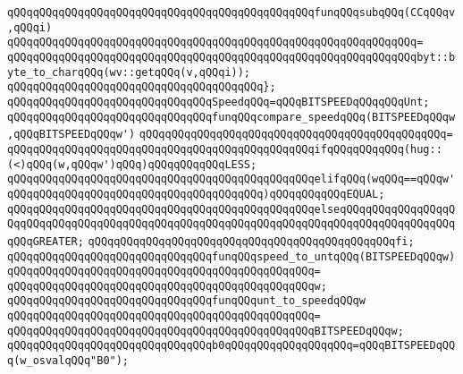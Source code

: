 \newline
\verb|qQQqqQQqqQQqqQQqqQQqqQQqqQQqqQQqqQQqqQQqqQQqqQQqfunqQQqsubqQQq(CCqQQqv,qQQqi)|\newline
\verb|qQQqqQQqqQQqqQQqqQQqqQQqqQQqqQQqqQQqqQQqqQQqqQQqqQQqqQQqqQQqqQQq=|\newline
\verb|qQQqqQQqqQQqqQQqqQQqqQQqqQQqqQQqqQQqqQQqqQQqqQQqqQQqqQQqqQQqqQQqbyt::byte_to_charqQQq(wv::getqQQq(v,qQQqi));|\newline
\verb|qQQqqQQqqQQqqQQqqQQqqQQqqQQqqQQqqQQqqQQq};|\newline
\newline
\verb|qQQqqQQqqQQqqQQqqQQqqQQqqQQqqQQqSpeedqQQq=qQQqBITSPEEDqQQqqQQqUnt;|\newline
\newline
\verb|qQQqqQQqqQQqqQQqqQQqqQQqqQQqqQQqfunqQQqcompare_speedqQQq(BITSPEEDqQQqw,qQQqBITSPEEDqQQqw')|\newline
\verb|qQQqqQQqqQQqqQQqqQQqqQQqqQQqqQQqqQQqqQQqqQQqqQQq=|\newline
\verb|qQQqqQQqqQQqqQQqqQQqqQQqqQQqqQQqqQQqqQQqqQQqqQQqifqQQqqQQqqQQq(hug::(<)qQQq(w,qQQqw')qQQq)qQQqqQQqqQQqLESS;|\newline
\verb|qQQqqQQqqQQqqQQqqQQqqQQqqQQqqQQqqQQqqQQqqQQqqQQqelifqQQq(wqQQq==qQQqw'qQQqqQQqqQQqqQQqqQQqqQQqqQQqqQQqqQQqqQQq)qQQqqQQqqQQqEQUAL;|\newline
\verb|qQQqqQQqqQQqqQQqqQQqqQQqqQQqqQQqqQQqqQQqqQQqqQQqelseqQQqqQQqqQQqqQQqqQQqqQQqqQQqqQQqqQQqqQQqqQQqqQQqqQQqqQQqqQQqqQQqqQQqqQQqqQQqqQQqqQQqqQQqqQQqGREATER;|\newline
\verb|qQQqqQQqqQQqqQQqqQQqqQQqqQQqqQQqqQQqqQQqqQQqqQQqfi;|\newline
\newline
\verb|qQQqqQQqqQQqqQQqqQQqqQQqqQQqqQQqfunqQQqspeed_to_untqQQq(BITSPEEDqQQqw)|\newline
\verb|qQQqqQQqqQQqqQQqqQQqqQQqqQQqqQQqqQQqqQQqqQQqqQQq=|\newline
\verb|qQQqqQQqqQQqqQQqqQQqqQQqqQQqqQQqqQQqqQQqqQQqqQQqw;|\newline
\newline
\verb|qQQqqQQqqQQqqQQqqQQqqQQqqQQqqQQqfunqQQqunt_to_speedqQQqw|\newline
\verb|qQQqqQQqqQQqqQQqqQQqqQQqqQQqqQQqqQQqqQQqqQQqqQQq=|\newline
\verb|qQQqqQQqqQQqqQQqqQQqqQQqqQQqqQQqqQQqqQQqqQQqqQQqBITSPEEDqQQqw;|\newline
\newline
\verb|qQQqqQQqqQQqqQQqqQQqqQQqqQQqqQQqb0qQQqqQQqqQQqqQQqqQQq=qQQqBITSPEEDqQQq(w_osvalqQQq"B0");|\newline
